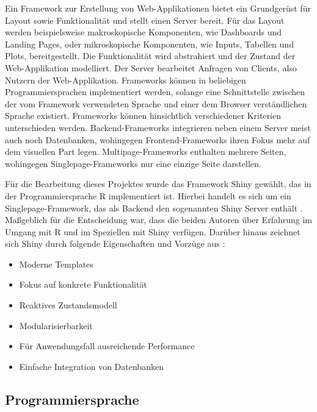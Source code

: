 \documentclass[
]{article}
\providecommand{\tightlist}{%
  \setlength{\itemsep}{0pt}\setlength{\parskip}{0pt}}
\begin{document}
Ein Framework zur Erstellung von Web-Applikationen bietet ein Grundgerüst für Layout sowie Funktionalität und stellt einen Server bereit. Für das Layout werden beispielsweise makroskopische Komponenten, wie Dashboards und Landing Pages, oder mikroskopische Komponenten, wie Inputs, Tabellen und Plots, bereitgestellt. Die Funktionalität wird abstrahiert und der Zustand der Web-Applikation modelliert. Der Server bearbeitet Anfragen von Clients, also Nutzern der Web-Applikation. Frameworks können in beliebigen Programmiersprachen implementiert werden, solange eine Schnittstelle zwischen der vom Framework verwendeten Sprache und einer dem Browser verständlichen Sprache existiert. Frameworks können hinsichtlich verschiedener Kriterien unterschieden werden. Backend-Frameworks integrieren neben einem Server meist auch noch Datenbanken, wohingegen Frontend-Frameworks ihren Fokus mehr auf dem visuellen Part legen. Multipage-Frameworks enthalten mehrere Seiten, wohingegen Singlepage-Frameworks nur eine einzige Seite darstellen.\autocite{framework}

Für die Bearbeitung dieses Projektes wurde das Framework Shiny gewählt, das in der Programmiersprache R implementiert ist. Hierbei handelt es sich um ein Singlepage-Framework, das als Backend den sogenannten Shiny Server enthält \autocite{shiny}. Maßgeblich für die Entscheidung war, dass die beiden Autoren über Erfahrung im Umgang mit R und im Speziellen mit Shiny verfügen. Darüber hinaus zeichnet sich Shiny durch folgende Eigenschaften und Vorzüge aus \autocite{shiny}:

\begin{itemize}
\tightlist
\item
  Moderne Templates
\item
  Fokus auf konkrete Funktionalität
\item
  Reaktives Zustandsmodell
\item
  Modularisierbarkeit
\item
  Für Anwendungsfall ausreichende Performance
\item
  Einfache Integration von Datenbanken
\end{itemize}

\hypertarget{programmiersprache}{%
\subsection{Programmiersprache}\label{programmiersprache}}
\end{document}
